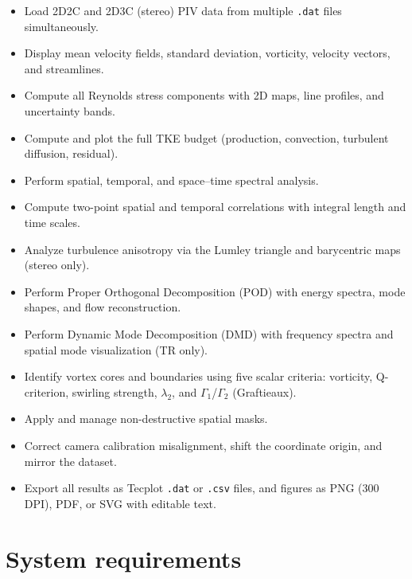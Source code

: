 \documentclass[11pt, a4paper]{report}
\begin{document}
\begin{itemize}[leftmargin=1.5em]
  \item Load 2D2C and 2D3C (stereo) PIV data from multiple \texttt{.dat} files simultaneously.
  \item Display mean velocity fields, standard deviation, vorticity, velocity vectors, and streamlines.
  \item Compute all Reynolds stress components with 2D maps, line profiles, and uncertainty bands.
  \item Compute and plot the full TKE budget (production, convection, turbulent diffusion, residual).
  \item Perform spatial, temporal, and space--time spectral analysis.
  \item Compute two-point spatial and temporal correlations with integral length and time scales.
  \item Analyze turbulence anisotropy via the Lumley triangle and barycentric maps (stereo only).
  \item Perform Proper Orthogonal Decomposition (POD) with energy spectra, mode shapes, and flow reconstruction.
  \item Perform Dynamic Mode Decomposition (DMD) with frequency spectra and spatial mode visualization (TR only).
  \item Identify vortex cores and boundaries using five scalar criteria: vorticity, Q-criterion, swirling strength, $\lambda_2$, and $\Gamma_1$/$\Gamma_2$ (Graftieaux).
  \item Apply and manage non-destructive spatial masks.
  \item Correct camera calibration misalignment, shift the coordinate origin, and mirror the dataset.
  \item Export all results as Tecplot \texttt{.dat} or \texttt{.csv} files, and figures as PNG (300 DPI), PDF, or SVG with editable text.
\end{itemize}

\section{System requirements}
\end{document}
